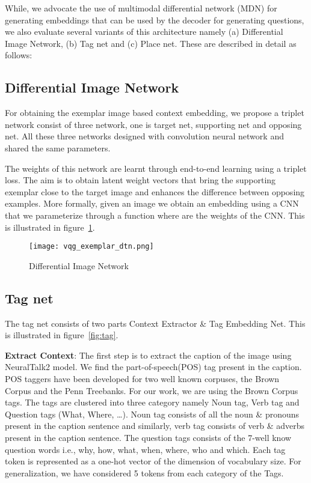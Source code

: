 \documentclass[11pt,a4paper]{article}
\begin{document}
\label{sec-4}
 While,  we  advocate  the  use  of  multimodal  differential network (MDN) for generating embeddings that can be used by the decoder for generating questions, we also evaluate several variants of this architecture namely (a) Differential Image Network, (b) Tag net and  (c) Place net. These are described in detail as follows:

\subsection{Differential Image Network}


For obtaining the exemplar image based context embedding, we propose a triplet network consist of three network, one is target net, supporting net and opposing net.  All these three networks designed with convolution neural network and shared the same parameters.

The weights of this network are learnt through end-to-end learning using  a triplet loss.  The aim is to obtain latent weight vectors that bring the supporting exemplar close to the target image  and enhances the difference between opposing examples.  More formally, given an image  we obtain an embedding  using a CNN that we parameterize through a function  where  are the weights of the CNN. This is illustrated in  figure~\ref{fig:DTN}.   
\begin{figure}[ht]
\centering
\texttt{[image: vqg\_exemplar\_dtn.png]}
	\caption{ Differential Image Network }
	\label{fig:DTN}
\end{figure}










\subsection{Tag net}
\label{sec:tag}
The tag net consists of two parts Context Extractor \& Tag Embedding Net. This is illustrated in figure~\ref{fig:tag}.

\textbf{Extract Context}:
The first step is to extract the caption of the image using NeuralTalk2 \cite{Karpathy_NIPS2014} model. We find the part-of-speech(POS) tag present in the caption. POS taggers have been developed for two well known corpuses, the Brown Corpus and the Penn Treebanks. For our work, we are using the Brown Corpus tags. The tags are clustered into three category namely Noun tag, Verb tag and Question tags (What, Where, \dots). Noun tag consists of all the noun \& pronouns present in the caption sentence and similarly, verb tag consists of verb \& adverbs present in the caption sentence. The question tags consists of the 7-well know question words {i.e., why, how, what, when, where, who and which}. Each tag token is represented as a one-hot vector of the dimension of vocabulary size. For generalization, we have considered 5 tokens from each category of the Tags.
\end{document}
